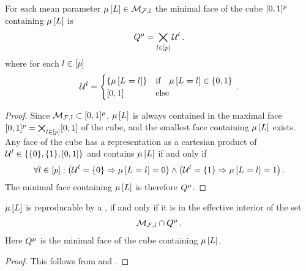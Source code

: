 \begin{lemma}
    \label{lem:minimalContainingFace}
    For each mean parameter $\mu\left[L\right]\in\mathcal{M}_{\mathcal{F},\mathbb{I}}$ the minimal face of the cube $[0,1]^{p}$ containing $\mu\left[L\right]$ is
    \begin{align*}
        Q^{\mu}
        = \bigtimes_{l\in[p]} \mathcal{U}^{l} \, .
    \end{align*}
    where for each $l\in[p]$
    \begin{align*}
        \mathcal{U}^{l} = \begin{cases}
                                   \{\mu\left[L_{}=l_{}\right]\} & \text{if}\quad \mu\left[L_{}=l_{}\right] \in \{0,1\} \\
                                   [0,1] & \text{else}
        \end{cases} \, .
    \end{align*}
\end{lemma}
\begin{proof}
    Since $\mathcal{M}_{\mathcal{F},\mathbb{I}}\subset[0,1]^{p}$, $\mu\left[L\right]$ is always contained in the maximal face $[0,1]^{p}=\bigtimes_{l\in[p]}[0,1]$ of the cube, and the smallest face containing $\mu\left[L\right]$ exists.
    Any face of the cube has a representation as a cartesian product of $\mathcal{U}^{l}\in\{\{0\},\{1\},[0,1]\}$ and contains $\mu\left[L\right]$ if and only if
    \begin{align*}
        \forall{l\in[p]}:{\left(\mathcal{U}^{l}=\{0\} \Rightarrow \mu\left[L_{}=l_{}\right]=0 \right) \land \left(\mathcal{U}^{l}=\{1\} \Rightarrow \mu\left[L_{}=l_{}\right]=1 \right)} \, .
    \end{align*}
    The minimal face containing $\mu\left[L\right]$ is therefore $Q^{\mu}$.
\end{proof}

\begin{lemma}
    $\mu\left[L\right]$ is reproducable by a \HybridLogicNetwork{}, if and only if it is in the effective interior of the set
    \begin{align*}
        \mathcal{M}_{\mathcal{F},\mathbb{I}}\cap Q^{\mu} \, .
    \end{align*}
    Here $Q^{\mu}$ is the minimal face of the cube containing $\mu\left[L\right]$.
\end{lemma}
\begin{proof}
    This follows from  and .
\end{proof}


